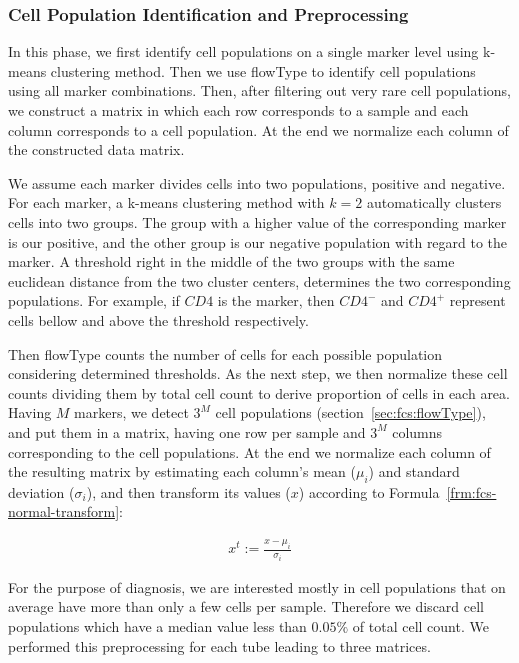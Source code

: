 \subsubsection{Cell Population Identification and Preprocessing}
In this phase, we first identify cell populations on a single marker level using k-means clustering method. Then we use flowType to identify cell populations using all marker combinations. Then, after filtering out very rare cell populations, we construct a matrix in which each row corresponds to a sample and each column corresponds to a cell population. At the end we normalize each column of the constructed data matrix.

We assume each marker divides cells into two populations, positive and negative. For each marker, a k-means clustering method with $k = 2$ automatically clusters cells into two groups. The group with a higher value of the corresponding marker is our positive, and the other group is our negative population with regard to the marker. A threshold right in the middle of the two groups with the same euclidean distance from the two cluster centers, determines the two corresponding populations. For example, if $CD4$ is the marker, then $CD4^-$ and $CD4^+$ represent cells bellow and above the threshold respectively.

Then flowType counts the number of cells for each possible population considering determined thresholds. As the next step, we then normalize these cell counts dividing them by total cell count to derive proportion of cells in each area. Having $M$ markers, we detect $3^M$ cell populations (section~\ref{sec:fcs:flowType}), and put them in a matrix, having one row per sample and $3^M$ columns corresponding to the cell populations. At the end we normalize each column of the resulting matrix by estimating each column's mean ($\mu_i$) and standard deviation ($\sigma_i$), and then transform its values ($x$) according to Formula~\ref{frm:fcs-normal-transform}:

\begin{align}
  x^t := \frac{x - \mu_i}{\sigma_i}
  \label{frm:fcs-normal-transform}
\end{align}

For the purpose of diagnosis, we are interested mostly in cell populations that on average have more than only a few cells per sample. Therefore we discard cell populations which have a median value less than $0.05\%$ of total cell count. We performed this preprocessing for each tube leading to three matrices.

